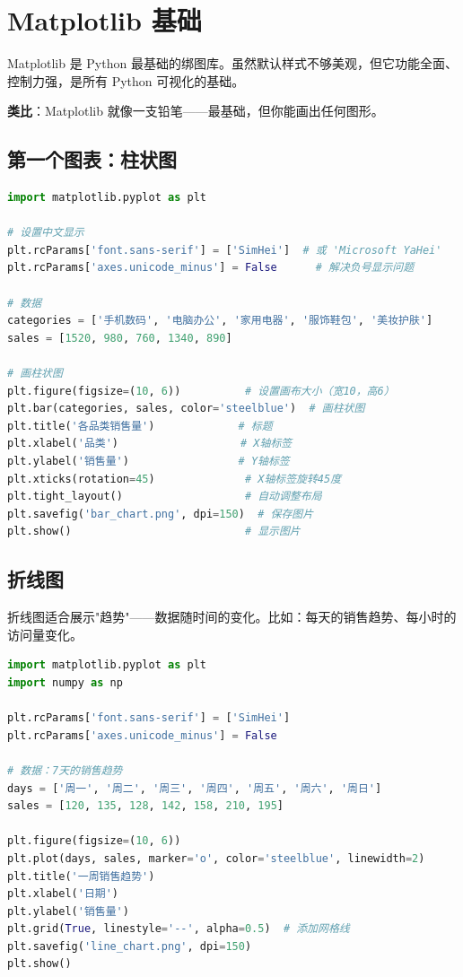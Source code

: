 \documentclass[12pt,a4paper]{article}
\begin{document}
\section{Matplotlib 基础}

\begin{knowledgebox}
Matplotlib 是 Python 最基础的绑图库。虽然默认样式不够美观，但它功能全面、控制力强，是所有 Python 可视化的基础。

\textbf{类比}：Matplotlib 就像一支铅笔——最基础，但你能画出任何图形。
\end{knowledgebox}

\subsection{第一个图表：柱状图}

\begin{lstlisting}[language=Python]
import matplotlib.pyplot as plt

# 设置中文显示
plt.rcParams['font.sans-serif'] = ['SimHei']  # 或 'Microsoft YaHei'
plt.rcParams['axes.unicode_minus'] = False      # 解决负号显示问题

# 数据
categories = ['手机数码', '电脑办公', '家用电器', '服饰鞋包', '美妆护肤']
sales = [1520, 980, 760, 1340, 890]

# 画柱状图
plt.figure(figsize=(10, 6))          # 设置画布大小（宽10，高6）
plt.bar(categories, sales, color='steelblue')  # 画柱状图
plt.title('各品类销售量')             # 标题
plt.xlabel('品类')                   # X轴标签
plt.ylabel('销售量')                 # Y轴标签
plt.xticks(rotation=45)              # X轴标签旋转45度
plt.tight_layout()                   # 自动调整布局
plt.savefig('bar_chart.png', dpi=150)  # 保存图片
plt.show()                           # 显示图片
\end{lstlisting}

\subsection{折线图}

\begin{theorybox}[折线图适合什么场景？]
折线图适合展示"趋势"——数据随时间的变化。比如：每天的销售趋势、每小时的访问量变化。
\end{theorybox}

\begin{lstlisting}[language=Python]
import matplotlib.pyplot as plt
import numpy as np

plt.rcParams['font.sans-serif'] = ['SimHei']
plt.rcParams['axes.unicode_minus'] = False

# 数据：7天的销售趋势
days = ['周一', '周二', '周三', '周四', '周五', '周六', '周日']
sales = [120, 135, 128, 142, 158, 210, 195]

plt.figure(figsize=(10, 6))
plt.plot(days, sales, marker='o', color='steelblue', linewidth=2)
plt.title('一周销售趋势')
plt.xlabel('日期')
plt.ylabel('销售量')
plt.grid(True, linestyle='--', alpha=0.5)  # 添加网格线
plt.savefig('line_chart.png', dpi=150)
plt.show()
\end{lstlisting}
\end{document}
